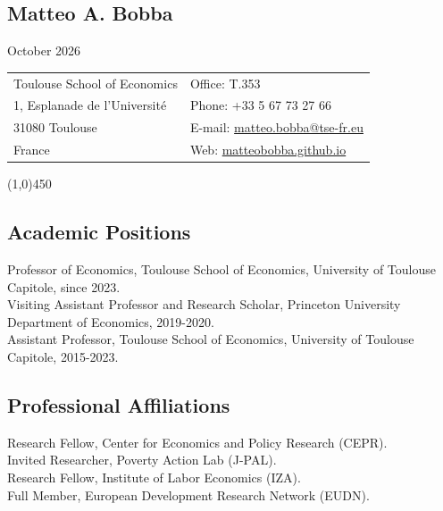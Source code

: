 \documentclass[12pt,english]{article}
\begin{document}


\noindent
\begin{center}
\section*{Matteo A. Bobba} \vspace{-0.3cm}
October 2026
\end{center} 
\begin{tabular}{p{9cm}p{9cm}}
Toulouse School of Economics &  Office: T.353  \\ 
1, Esplanade de l'Universit\'{e} & Phone: +33 5 67 73 27 66\\
31080 Toulouse  &  E-mail: \href{mailto: matteo.bobba@tse-fr.eu}{matteo.bobba@tse-fr.eu} \\
France & Web: \href{https://matteobobba.github.io/}{matteobobba.github.io}  \\
\end{tabular}
\vspace{-0.1cm}
\line(1,0){450} \\
\vspace{-0.3cm}

\subsection*{Academic Positions}
Professor of Economics, Toulouse School of Economics, University of Toulouse Capitole, since 2023. \vspace{0.2cm} \\ 
Visiting Assistant Professor and Research Scholar, Princeton University Department of Economics, 2019-2020. \vspace{0.2cm} \\
Assistant Professor, Toulouse School of Economics, University of Toulouse Capitole, 2015-2023. 

\subsection*{Professional Affiliations}
Research Fellow, Center for Economics and Policy Research (CEPR).\vspace{0.2cm} \\
Invited Researcher, Poverty Action Lab (J-PAL). \vspace{0.2cm} \\ 
Research Fellow, Institute of Labor Economics (IZA). \vspace{0.2cm} \\ 
Full Member, European Development Research Network (EUDN).
\end{document}

